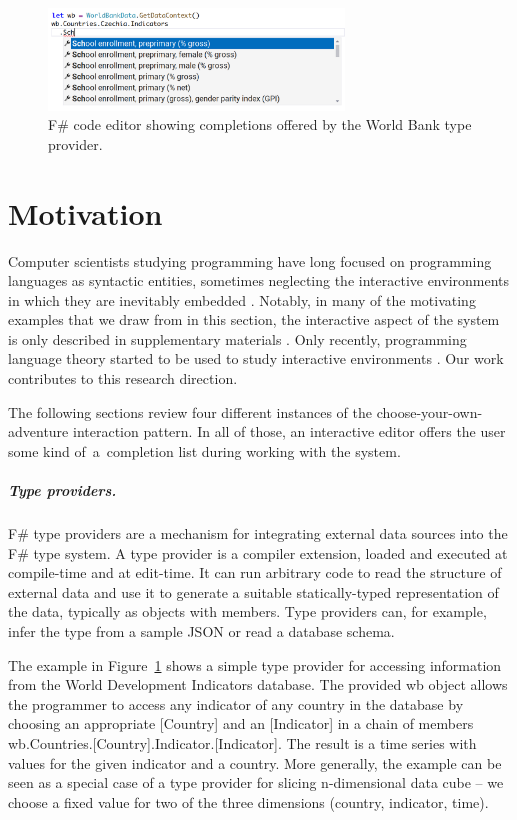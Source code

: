 \documentclass[a4paper,UKenglish,cleveref, autoref, thm-restate]{lipics-v2021}
\newcommand{\ident}[1]{\textsf{#1}}
\begin{document}
\newpage

\begin{figure}[t]
  \includegraphics[width=0.7\textwidth]{fig/worldbank.png}
  \caption{F\# code editor showing completions offered by the World Bank type provider.}
  \label{fig:worldbank}
\end{figure}

\section{Motivation}
\label{sec:motivation}

Computer scientists studying programming have long focused on programming languages as syntactic
entities, sometimes neglecting the interactive environments in which they are inevitably
embedded \cite{rpg-2012-revolution}. Notably, in many of the motivating examples that we draw
from in this section, the interactive aspect of the system is only described in supplementary
materials \cite{brady-2015-idris,syme-2013-inforich,altenkirch-1994-alf}. Only recently, programming
language theory started to be used to study interactive environments
\cite{adams-2025-grove,mayer-2018-bidirectional}. Our work contributes to this research direction.

The following sections review four different instances of the choose-your-own-adventure
interaction pattern. In all of those, an interactive editor offers the user some kind of~a~com\-pletion list during working with the system.

\subparagraph{Type providers.}

F\# type providers \cite{syme-2013-inforich} are a mechanism for integrating external data
sources into the F\# type system. A type provider is a compiler extension, loaded and
executed at compile-time and at edit-time. It can run arbitrary code to read the structure of
external data and use it to generate a suitable statically-typed representation of the
data, typically as objects with members. Type providers can, for example, infer the type from a
sample JSON \cite{petricek-2016-fsdata} or read a database schema.

The example in Figure~\ref{fig:worldbank} shows a simple type provider for accessing information
from the World Development Indicators database. The provided \ident{wb} object allows the programmer
to access any indicator of any country in the database by choosing an appropriate \ident{[Country]}
and an \ident{[Indicator]} in a chain of members
\ident{wb}.\ident{Countries}.\ident{[Country]}.\ident{Indicator}.\ident{[Indicator]}.
The result is a time series with values for the given indicator and a country. More generally,
the example can be seen as a special case of a type provider for slicing n-dimensional
data cube \cite{petricek-2022-thegamma} -- we choose a fixed value for two of the three
dimensions (country, indicator, time).
\end{document}
